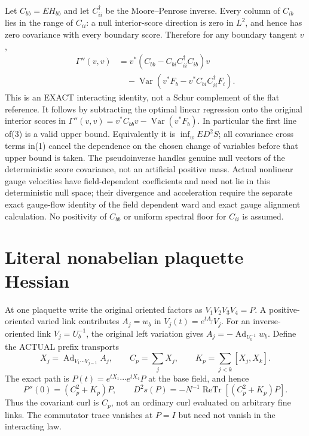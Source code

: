 \documentclass{article}
\begin{document}
Let $C_{bb}=E H_{bb}$ and let $C_{ii}^{\dagger}$ be the Moore--Penrose inverse. Every column of $C_{ib}$ lies in the range of $C_{ii}$: a null interior-score direction is zero in $L^2$, and hence has zero covariance with every boundary score. Therefore for any boundary tangent $v$,
\[
 \begin{split}
 \Gamma''(v,v)
 &=v^*\left(C_{bb}-C_{bi}C_{ii}^{\dagger}C_{ib}\right)v\\
 &\quad-\operatorname{Var}\left(v^*F_b-v^*C_{bi}C_{ii}^{\dagger}F_i\right).
 \end{split}                                                        \tag{3}
\]
This is an EXACT interacting identity, not a Schur complement of the flat reference. It follows by subtracting the optimal linear regression onto the original interior scores in
$\Gamma''(v,v)=v^*C_{bb}v-\operatorname{Var}(v^*F_b)$.
In particular the first line of(3) is a valid upper bound. Equivalently it is
$\inf_w E D^2S$; all covariance cross terms in(1) cancel the dependence on the chosen change of variables before that upper bound is taken.
The pseudoinverse handles genuine null vectors of the deterministic score covariance, not an artificial positive mass. Actual nonlinear gauge velocities have field-dependent coefficients and need not lie in this deterministic null space; their divergence and acceleration require the separate exact gauge-flow identity of the field dependent ward and exact gauge alignment calculation. No positivity of $C_{bb}$ or uniform spectral floor for $C_{ii}$ is assumed.

\section*{Literal nonabelian plaquette Hessian}
At one plaquette write the original oriented factors as $V_1V_2V_3V_4=P$.
A positive-oriented varied link contributes $A_j=w_b$ in
$V_j(t)=e^{tA_j}V_j$. For an inverse-oriented link $V_j=U_b^{-1}$, the original left variation gives
$A_j=-\operatorname{Ad}_{U_b^{-1}}w_b$.
Define the ACTUAL prefix transports
\[
 X_j=\operatorname{Ad}_{V_1\cdots V_{j-1}}A_j,\qquad
 C_p=\sum_jX_j,\qquad K_p=\sum_{j<k}[X_j,X_k].
\]
The exact path is $P(t)=e^{tX_1}\cdots e^{tX_4}P$ at the base field, and hence
\[
 P''(0)=(C_p^2+K_p)P,\qquad
 D^2s(P)=-N^{-1}\operatorname{ReTr}[(C_p^2+K_p)P].      \tag{4}
\]
Thus the covariant curl is $C_p$, not an ordinary curl evaluated on arbitrary fine links. The commutator trace vanishes at $P=I$ but need not vanish in the interacting law.
\end{document}
